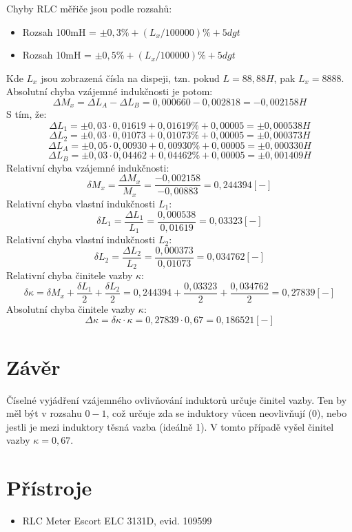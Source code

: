 \documentclass[12pt]{article} %
\begin{document}
Chyby RLC měřiče jsou podle rozsahů:
\begin{itemize}
\item Rozsah 100mH = $\pm 0,3\% + (L_x/100000)\% + 5dgt$
\item Rozsah 10mH = $\pm 0,5\% + (L_x/100000)\% + 5dgt$
\end{itemize}
Kde $L_x$ jsou zobrazená čísla na dispeji, tzn. pokud $L=88,88H$, pak $L_x=8888$.
Absolutní chyba vzájemné indukčnosti je potom:
\begin{equation}
\Delta M_x = \Delta L_A - \Delta L_B = 0,000660 - 0,002818 = -0,002158H
\end{equation}
S tím, že:
$$\Delta L_1 = \pm 0,03\cdot 0,01619 + 0,01619\% + 0,00005 = \pm 0,000538 H$$
$$\Delta L_2 = \pm 0,03\cdot 0,01073 + 0,01073\% + 0,00005 = \pm 0,000373 H$$
$$\Delta L_A = \pm 0,05\cdot 0,00930 + 0,00930\% + 0,00005 = \pm 0,000330 H$$
$$\Delta L_B = \pm 0,03\cdot 0,04462 + 0,04462\% + 0,00005 = \pm 0,001409 H$$
Relativní chyba vzájemné indukčnosti:
\begin{equation}
\delta M_x = \frac{\Delta M_x}{M_x} = \frac{-0,002158}{-0,00883} = 0,244394 [-]
\end{equation}
Relativní chyba vlastní indukčnosti $L_1$:
\begin{equation}
\delta L_1 = \frac{\Delta L_1}{L_1} = \frac{0,000538}{0,01619} = 0,03323 [-]
\end{equation}
Relativní chyba vlastní indukčnosti $L_2$:
\begin{equation}
\delta L_2 = \frac{\Delta L_2}{L_2} = \frac{0,000373}{0,01073} = 0,034762 [-]
\end{equation}
Relativní chyba činitele vazby $\kappa$:
\begin{equation}
\delta \kappa = \delta M_x + \frac{\delta L_1}{2} + \frac{\delta L_2}{2} = 0,244394 + \frac{0,03323}{2} + \frac{0,034762}{2} = 0,27839 [-]
\end{equation}
Absolutní chyba činitele vazby $\kappa$:
\begin{equation}
\Delta \kappa = \delta \kappa \cdot \kappa = 0,27839 \cdot 0,67 = 0,186521 [-]
\end{equation}

\section{Závěr}
Číselné vyjádření vzájemného ovlivňování induktorů určuje činitel vazby. Ten by měl být v rozsahu $0-1$, což určuje zda se induktory vůcen neovlivňují (0), nebo jestli je mezi induktory těsná vazba (ideálně 1). V tomto případě vyšel činitel vazby $\kappa = 0,67$.

\section{Přístroje}
\begin{itemize}
\item RLC Meter Escort ELC 3131D, evid. 109599
\end{itemize}
\end{document}
